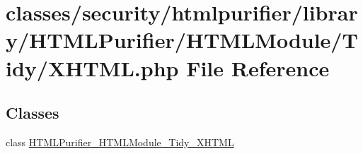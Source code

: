 \hypertarget{XHTML_8php}{\section{classes/security/htmlpurifier/library/\+H\+T\+M\+L\+Purifier/\+H\+T\+M\+L\+Module/\+Tidy/\+X\+H\+T\+M\+L.php File Reference}
\label{XHTML_8php}
}
\subsection*{Classes}
\begin{DoxyCompactItemize}
\item 
class \hyperlink{classHTMLPurifier__HTMLModule__Tidy__XHTML}{H\+T\+M\+L\+Purifier\+\_\+\+H\+T\+M\+L\+Module\+\_\+\+Tidy\+\_\+\+X\+H\+T\+M\+L}
\end{DoxyCompactItemize}
